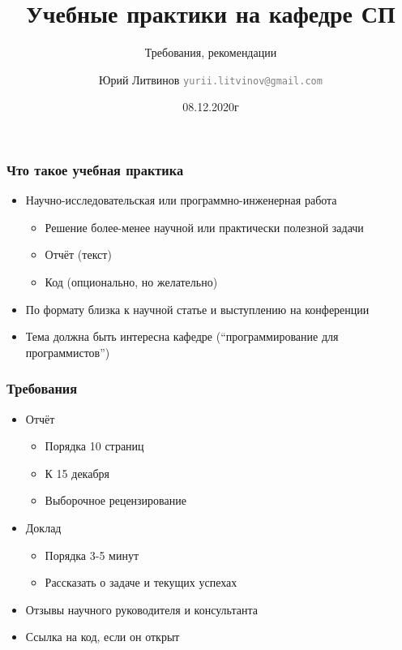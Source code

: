 \documentclass[xetex,mathserif,serif]{beamer}
\title{Учебные практики на кафедре СП}
\subtitle{Требования, рекомендации}
\author[Юрий Литвинов]{Юрий Литвинов \newline \textcolor{gray}{\small\texttt{yurii.litvinov@gmail.com}}}
\date{08.12.2020г}
\begin{document}
    
    \frame{\titlepage}

    \begin{frame}
        \frametitle{Что такое учебная практика}
        \begin{itemize}
            \item Научно-исследовательская или программно-инженерная работа
            \begin{itemize}
                \item Решение более-менее научной или практически полезной задачи
                \item Отчёт (текст)
                \item Код (опционально, но желательно)
            \end{itemize}
            \item По формату близка к научной статье и выступлению на конференции
            \item Тема должна быть интересна кафедре (``программирование для программистов'')
        \end{itemize}
    \end{frame}

    \begin{frame}
        \frametitle{Требования}
        \begin{itemize}
            \item Отчёт
            \begin{itemize}
                \item Порядка 10 страниц
                \item К 15 декабря
                \item Выборочное рецензирование
            \end{itemize}
            \item Доклад
            \begin{itemize}
                \item Порядка 3-5 минут
                \item Рассказать о задаче и текущих успехах
            \end{itemize}
            \item Отзывы научного руководителя и консультанта
            \item Ссылка на код, если он открыт
        \end{itemize}
    \end{frame}
\end{document}
